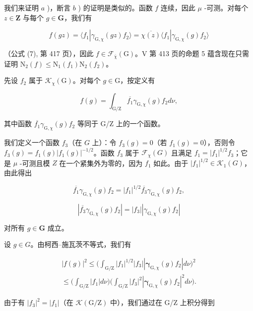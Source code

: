 我们来证明 \(a\) )，断言 \(b\) ) 的证明是类似的。函数 \(f\) 连续，因此 \(\mu\) -可测。对每个 \(z \in \mathbf{Z}\) 与每个 \(g \in \mathbf{G}\)，我们有

\[
f (g z) = \langle f _ {1} | \gamma_ {\mathrm{G}, \chi} (g z) f _ {2} \rangle = \overline {{\chi (z)}} \langle f _ {1} | \gamma_ {\mathrm{G}, \chi} (g) f _ {2} \rangle
\]

（公式 (7), 第 417 页），因此 \(f \in \mathcal{F}_{\overline{\chi}}(\mathrm{G})\)。V 第 413 页的命题 5 蕴含现在只需证明 \(\mathrm{N}_2(f) \leqslant \mathrm{N}_1(f_1)\mathrm{N}_2(f_2)\)。

先设 \(f_2\) 属于 \(\mathcal{K}_{\chi}(\mathrm{G})\)。对每个 \(g \in \mathrm{G}\)，按定义有

\[
f (g) = \int_ {\mathrm{G/Z}} \overline {{f _ {1}}} \gamma_ {\mathrm{G}, \chi} (g) f _ {2} d \nu ,
\]

其中函数 \(\overline{f_1} \gamma_{\mathrm{G},\chi}(g)f_2\) 等同于 G/Z 上的一个函数。

我们定义一个函数 \(f_3\)（在 \(G\) 上）：令 \(f_3(g) = 0\)（若 \(f_1(g) = 0\)），否则令 \(f_3(g) = f_1(g)|f_1(g)|^{-1/2}\)。函数 \(f_3\) 属于 \(\mathcal{F}_{\chi}(G)\) 且满足 \(f_1 = |f_1|^{1/2}f_3\)；它是 \(\mu\) -可测且模 \(Z\) 在一个紧集外为零的，因为 \(f_1\) 如此。由于 \(|f_1|^{1/2} \in \mathcal{K}_1(G)\)，由此得出

\[
\overline {{f _ {1}}} \gamma_ {\mathrm{G}, \chi} (g) f _ {2} = | f _ {1} | ^ {1 / 2} \overline {{f _ {3}}} \gamma_ {\mathrm{G}, \chi} (g) f _ {2},
\]

\[
| \overline {{f _ {3}}} \gamma_ {\mathrm{G}, \chi} (g) f _ {2} | = | f _ {3} | | \gamma_ {\mathrm{G}, \chi} (g) f _ {2} |
\]

对所有 \(g \in \mathbf{G}\) 成立。

 设 \(g \in G\)。由柯西--施瓦茨不等式，我们有

\[
\begin{array}{l} | f (g) | ^ {2} \leqslant \Big (\int_ {\mathrm{G/Z}} | f _ {1} | ^ {1 / 2} | f _ {3} | | \boldsymbol {\gamma} _ {\mathrm{G}, \chi} (g) f _ {2} | d \nu \Big) ^ {2} \\ \leqslant \Big (\int_ {\mathrm{G/Z}} | f _ {1} | d \nu \Big) \Big (\int_ {\mathrm{G/Z}} | f _ {3} | ^ {2} | \boldsymbol {\gamma} _ {\mathrm{G}, \chi} (g) f _ {2} | ^ {2} d \nu \Big). \end{array}
\]

由于有 \(|f_{3}|^{2}=|f_{1}|\)（在 \(\mathcal{K}(\mathrm{G}/\mathrm{Z})\) 中），我们通过在 G/Z 上积分得到

